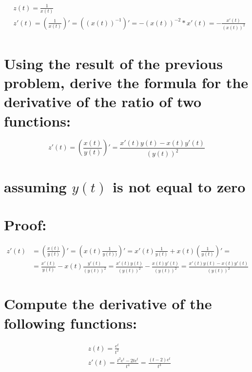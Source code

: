 \documentclass{article}
\begin{document}
\begin{equation}
\begin{split}
& z(t) = \frac{1}{x(t)} \\
& z'(t) = (\frac{1}{x(t)})' = ((x(t))^{-1})' = -(x(t))^{-2}*x'(t) = -\frac{x'(t)}{(x(t))^2} \\
\end{split}
\end{equation}

\section{\normalfont Using the result of the previous problem, derive the formula for the derivative of the ratio of two functions:}

\begin{equation}
z'(t) = (\frac{x(t)}{y(t)})' = \frac{x'(t)y(t) - x(t)y'(t)}{(y(t))^2}
\end{equation}

\section*{\normalfont assuming $y(t)$ is not equal to zero}

\section*{Proof:}

\begin{equation}
\begin{split}
z'(t) & = (\frac{x(t)}{y(t)})' = (x(t)\frac{1}{y(t))})' = x'(t)\frac{1}{y(t)} + x(t)(\frac{1}{y(t)})' = \\ 
& = \frac{x'(t)}{y(t)} - x(t)\frac{y'(t)}{(y(t))^2} = \frac{x'(t)y(t)}{(y(t))^2} - \frac{x(t)y'(t)}{(y(t))^2} = \frac{x'(t)y(t) - x(t)y'(t)}{(y(t))^2}
\end{split}
\end{equation}

\section{\normalfont Compute the derivative of the following functions:}

\begin{equation}
\begin{split}
& z(t) = \frac{e^t}{t^2} \\
& z'(t) = \frac{t^2e^t - 2te^t}{t^4} = \frac{(t - 2)e^t}{t^3}
\end{split}    
\end{equation}
\end{document}
